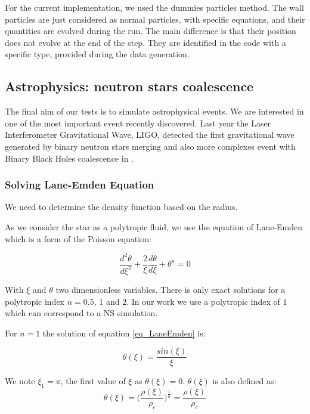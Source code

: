 For the current implementation, we used the dummies particles method.
The wall particles are just considered as normal particles, with specific equations, and their quantities are evolved during the run. 
The main difference is that their position does not evolve at the end of the step.
They are identified in the code with a specific type, provided during the data generation. 

\subsection{Astrophysics: neutron stars coalescence}

The final aim of our tests is to simulate astrophysical events. 
We are interested in one of the most important event recently discovered. 
Last year the Laser Interferometer Gravitational Wave, LIGO, detected the first gravitational wave generated by binary neutron stars merging \cite{abbott2017gw170817} and also more complexes event with Binary Black Holes coalescence in \cite{abbott2017gw170814}.


\subsubsection{Solving Lane-Emden Equation}

We need to determine the density function based on the radius. 

As we consider the star as a polytropic fluid, we use the equation of Lane-Emden which is a form of the Poisson equation: 

\begin{equation}\label{eq_LaneEmden}
  \frac{d^2\theta}{d \xi^2}+ \frac{2}{\xi}\frac{d\theta}{d\xi}+\theta^n = 0
\end{equation}

With $\xi$ and $\theta$ two dimensionless variables. 
There is only exact solutions for a polytropic index $n = 0.5$, $1$ and $2$.
In our work we use a polytropic index of $1$ which can correspond to a NS simulation.

For $n=1$ the solution of equation \ref{eq_LaneEmden} is: 

\begin{equation}
\theta(\xi)=\frac{sin(\xi)}{\xi}
\end{equation}

We note $\xi_1 = \pi$, the first value of $\xi$ as $\theta(\xi) = 0$.
$\theta(\xi)$ is also defined as: 
\begin{equation}
 \theta(\xi) = \Big(\frac{\rho(\xi)}{\rho_c}\Big)^{\frac{1}{n}}  = \frac{\rho(\xi)}{\rho_c}
\end{equation}

